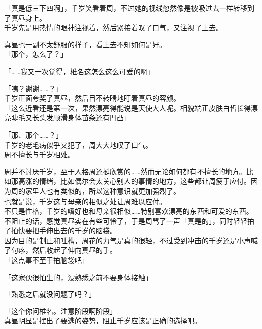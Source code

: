 「真是低三下四啊」，千岁笑看着周，不过她的视线忽然像是被吸过去一样转移到了真昼身上。\\

千岁先是用热情的眼神注视着，然后紧接着叹了口气，又注视了上去。

真昼也一副不太舒服的样子，看上去不知如何是好。\\

「那个，怎么了？」

「……我又一次觉得，椎名这怎么这么可爱的啊」

「咦？谢谢……？」\\

千岁正面夸奖了真昼，然后目不转睛地盯着真昼的容颜。\\

「这么近看还是第一次，果然漂亮得能说是天使大人呢。相貌端正皮肤白皙长得漂亮睫毛又长头发顺滑身体苗条还有凹凸」

「那、那个……？」\\

千岁的老毛病似乎又犯了，周大大地叹了口气。\\

周不擅长与千岁相处。

周并不讨厌千岁，至于人格周还挺欣赏的……然而无论如何都有不擅长的地方。比如那高涨的情绪，比如偶尔会太关心别人的事情的地方，这些都让周疲于应付。因为周的家里人也有类似的，所以这种意识就更加强烈了。\\

也就是说，千岁这与母亲的相似之处让周难以应付。\\

不只是性格，千岁的嗜好也和母亲很相似……特别喜欢漂亮的东西和可爱的东西。\\

不阻止的话，感觉真昼实在有些可怜了，于是周骂了一声「真是的」，同时轻轻拍了拍快要把手伸出去的千岁的脑袋。\\

因为目的是制止和吐槽，周花的力气是真的很轻，不过受到冲击的千岁还是小声喊了句疼，然后收起了伸向真昼的手。\\

「这点事不至于拍脑袋吧」

「这家伙很怕生的，没熟悉之前不要身体接触」

「熟悉之后就没问题了吗？」

「这个你问椎名。注意阶段啊阶段」\\

真昼明显是摆出了要逃的姿势，阻止千岁应该是正确的选择吧。\\

